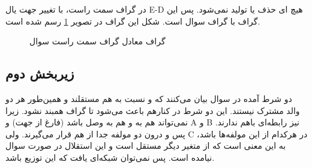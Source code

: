 در گراف سمت راست، با تغییر جهت یال 
E-D
هیچ 
ای حذف یا تولید نمی‌شود. پس این گراف با گراف سوال 
است. شکل این گراف در تصویر
\ref{q1:4-equiv}
رسم شده است.
\begin{figure}[H]
	\centering
	\caption{گراف معادل گراف سمت راست سوال}
	\label{q1:4-equiv}
\end{figure}
\subsection{زیربخش دوم}
دو شرط آمده در سوال بیان می‌کنند که 
و
نسبت به هم مستقلند و همین‌طور هر دو والد مشترک  نیستند. این دو شرط در کنارهم باعث می‌شود تا گراف همبند نشود. زیرا  نمی‌تواند هم به 
و
هم به 
وصل باشد (فارغ از جهت) و 
A
و
B
نیز رابطه‌ای باهم ندارند.  پس  و  درون دو مولفه جدا از هم قرار می‌گیرند. ولی C در هرکدام از این مولفه‌ها باشد، به این معنی است که از متغیر دیگر مستقل است و این استقلال در صورت سوال نیامده است. پس نمی‌توان شبکه‌ای یافت که 
این توزیع باشد.
